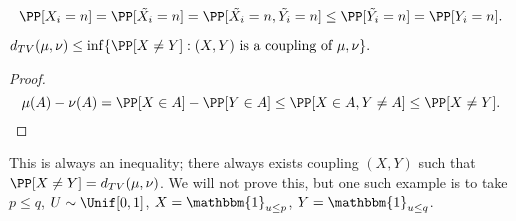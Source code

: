 \[\PP[X_i=n] = \PP[\tilde{X_i}=n] = \PP[\tilde{X_i}=n, \tilde{Y_i}=n]\leq \PP[\tilde{Y_i}=n] = \PP[Y_i=n].\]

\begin{theorem}
\proplabel

$d_{TV}(\mu, \nu) \leq \inf\{\PP[X\neq Y] : (X,Y)\text{ is a coupling of }\mu, \nu\}.$
\end{theorem}

\begin{proof}
\[\mu(A) - \nu(A) = \PP[X\in A] - \PP[Y\in A] \leq \PP[X\in A, Y\neq A]\leq \PP[X\neq Y].\]
\end{proof}

This is always an inequality; there always exists coupling $(X,Y)$ such that $\PP[X\neq Y] = d_{TV}(\mu, \nu)$. We will not prove this, but one such example is to take $p\leq q$, $U\sim \Unif[0,1]$, $X=\mathbbm{1}_{u\leq p}$, $Y=\mathbbm{1}_{u\leq q}$. 


